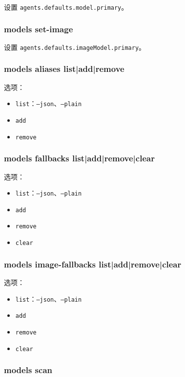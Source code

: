 设置 \texttt{agents.defaults.model.primary}。

\subsubsection{models set-image }


设置 \texttt{agents.defaults.imageModel.primary}。

\subsubsection{models aliases list|add|remove}


选项：

\begin{itemize}
  \item \texttt{list}：\texttt{--json}、\texttt{--plain}
  \item \texttt{add  }
  \item \texttt{remove }
\end{itemize}


\subsubsection{models fallbacks list|add|remove|clear}


选项：

\begin{itemize}
  \item \texttt{list}：\texttt{--json}、\texttt{--plain}
  \item \texttt{add }
  \item \texttt{remove }
  \item \texttt{clear}
\end{itemize}


\subsubsection{models image-fallbacks list|add|remove|clear}


选项：

\begin{itemize}
  \item \texttt{list}：\texttt{--json}、\texttt{--plain}
  \item \texttt{add }
  \item \texttt{remove }
  \item \texttt{clear}
\end{itemize}


\subsubsection{models scan}


